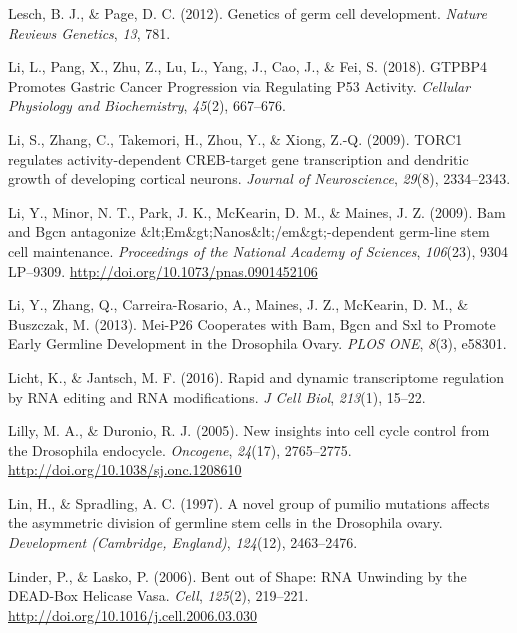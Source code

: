 \documentclass[12pt,twoside]{reedthesis}
\newlength{\cslhangindent}
\newenvironment{cslreferences}%
  {\setlength{\parindent}{0pt}%
  \everypar{\setlength{\hangindent}{\cslhangindent}}\ignorespaces}%
  {\par}
\begin{document}
\begin{cslreferences}
\leavevmode\hypertarget{ref-Lesch2012b}{}%
Lesch, B. J., \& Page, D. C. (2012). Genetics of germ cell development. \emph{Nature Reviews Genetics}, \emph{13}, 781.

\leavevmode\hypertarget{ref-Li2018a}{}%
Li, L., Pang, X., Zhu, Z., Lu, L., Yang, J., Cao, J., \& Fei, S. (2018). GTPBP4 Promotes Gastric Cancer Progression via Regulating P53 Activity. \emph{Cellular Physiology and Biochemistry}, \emph{45}(2), 667--676.

\leavevmode\hypertarget{ref-Li2009n}{}%
Li, S., Zhang, C., Takemori, H., Zhou, Y., \& Xiong, Z.-Q. (2009). TORC1 regulates activity-dependent CREB-target gene transcription and dendritic growth of developing cortical neurons. \emph{Journal of Neuroscience}, \emph{29}(8), 2334--2343.

\leavevmode\hypertarget{ref-Li2009h}{}%
Li, Y., Minor, N. T., Park, J. K., McKearin, D. M., \& Maines, J. Z. (2009). Bam and Bgcn antagonize \&lt;Em\&gt;Nanos\&lt;/em\&gt;-dependent germ-line stem cell maintenance. \emph{Proceedings of the National Academy of Sciences}, \emph{106}(23), 9304 LP--9309. \url{http://doi.org/10.1073/pnas.0901452106}

\leavevmode\hypertarget{ref-Li2013h}{}%
Li, Y., Zhang, Q., Carreira-Rosario, A., Maines, J. Z., McKearin, D. M., \& Buszczak, M. (2013). Mei-P26 Cooperates with Bam, Bgcn and Sxl to Promote Early Germline Development in the Drosophila Ovary. \emph{PLOS ONE}, \emph{8}(3), e58301.

\leavevmode\hypertarget{ref-Licht2016}{}%
Licht, K., \& Jantsch, M. F. (2016). Rapid and dynamic transcriptome regulation by RNA editing and RNA modifications. \emph{J Cell Biol}, \emph{213}(1), 15--22.

\leavevmode\hypertarget{ref-Lilly2005d}{}%
Lilly, M. A., \& Duronio, R. J. (2005). New insights into cell cycle control from the Drosophila endocycle. \emph{Oncogene}, \emph{24}(17), 2765--2775. \url{http://doi.org/10.1038/sj.onc.1208610}

\leavevmode\hypertarget{ref-Lin1997b}{}%
Lin, H., \& Spradling, A. C. (1997). A novel group of pumilio mutations affects the asymmetric division of germline stem cells in the Drosophila ovary. \emph{Development (Cambridge, England)}, \emph{124}(12), 2463--2476.

\leavevmode\hypertarget{ref-Linder2006}{}%
Linder, P., \& Lasko, P. (2006). Bent out of Shape: RNA Unwinding by the DEAD-Box Helicase Vasa. \emph{Cell}, \emph{125}(2), 219--221. \url{http://doi.org/10.1016/j.cell.2006.03.030}


\end{cslreferences}
\end{document}
